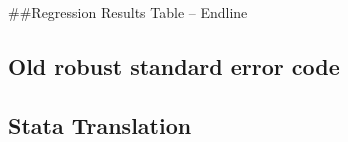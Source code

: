 \documentclass[
]{article}
\begin{document}
\#\#Regression Results Table -- Endline

\hypertarget{old-robust-standard-error-code}{%
\subsection{Old robust standard error
code}\label{old-robust-standard-error-code}}

\hypertarget{stata-translation}{%
\subsection{Stata Translation}\label{stata-translation}}
\end{document}
